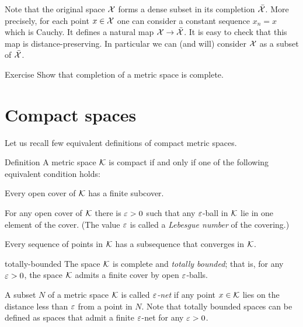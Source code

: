 Note that the original space $\mathcal{X}$ forms a dense subset in its completion $\bar{\mathcal{X}}$.
More precisely,  for each point $x\in\mathcal{X}$ one can consider a constant sequence $x_n=x$ which is Cauchy.
It defines a natural map $\mathcal{X}\to \bar{\mathcal{X}}$.
It is easy to check that this map is distance-preserving.
In particular we can (and will) consider $\mathcal{X}$ as a subset of $\bar{\mathcal{X}}$.

\begin{thm}{Exercise}
Show that completion of a metric space is complete.
\end{thm}


\section{Compact spaces}

Let us recall few equivalent definitions of compact metric spaces.

\begin{thm}{Definition}\label{def:compact}
A metric space $\mathcal{K}$ is compact if and only if one of the following equivalent condition holds:

\begin{subthm}{}
 Every open cover of $\mathcal{K}$ has a finite subcover.
\end{subthm}

\begin{subthm}{}
 For any open cover of $\mathcal{K}$ there is $\varepsilon>0$ such that any $\varepsilon$-ball in $\mathcal{K}$ lie in one element of the cover. (The value $\varepsilon$ is called a \emph{Lebesgue number} of the covering.)
\end{subthm}

\begin{subthm}{}
 Every sequence of points in $\mathcal{K}$ has a subsequence that converges in $\mathcal{K}$.
\end{subthm}

\begin{subthm}{totally-bounded}
The space $\mathcal{K}$ is complete and \emph{totally bounded}; that is, for any $\varepsilon>0$, the space $\mathcal{K}$ admits a finite cover by open $\varepsilon$-balls.
\end{subthm}

\end{thm}

A subset $N$ of a metric space $\mathcal{K}$ is called \emph{$\varepsilon$-net} if any point $x\in \mathcal{K}$ lies on the distance less than $\varepsilon$ from a point in $N$.
Note that totally bounded spaces can be defined as spaces that admit a finite $\varepsilon$-net for any $\varepsilon>0$.

